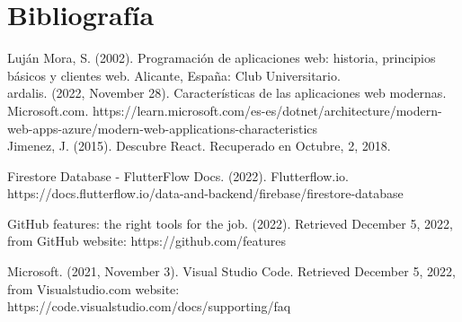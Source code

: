 \documentclass[12pt]{book}
\begin{document}
	\chapter{Bibliografía}
	
	Luján Mora, S. (2002). Programación de aplicaciones web: historia, principios básicos y clientes web. Alicante,
España: Club Universitario. \\

	ardalis. (2022, November 28). Características de las aplicaciones web modernas. Microsoft.com. https://learn.microsoft.com/es-es/dotnet/architecture/modern-web-apps-azure/modern-web-applications-characteristics \\
	
	Jimenez, J. (2015). Descubre React. Recuperado en Octubre, 2, 2018.
	
	Firestore Database - FlutterFlow Docs. (2022). Flutterflow.io. https://docs.flutterflow.io/data-and-backend/firebase/firestore-database
	
	
	GitHub features: the right tools for the job. (2022). Retrieved December 5, 2022, from GitHub website: https://github.com/features
	
	‌Microsoft. (2021, November 3). Visual Studio Code. Retrieved December 5, 2022, from Visualstudio.com website: https://code.visualstudio.com/docs/supporting/faq
	
	‌
	
	‌
	
	
	
\end{document}

